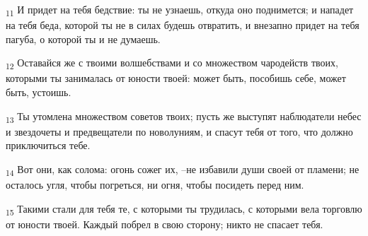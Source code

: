 \begin{tcolorbox}
\textsubscript{11} И придет на тебя бедствие: ты не узнаешь, откуда оно поднимется; и нападет на тебя беда, которой ты не в силах будешь отвратить, и внезапно придет на тебя пагуба, о которой ты и не думаешь.
\end{tcolorbox}
\begin{tcolorbox}
\textsubscript{12} Оставайся же с твоими волшебствами и со множеством чародейств твоих, которыми ты занималась от юности твоей: может быть, пособишь себе, может быть, устоишь.
\end{tcolorbox}
\begin{tcolorbox}
\textsubscript{13} Ты утомлена множеством советов твоих; пусть же выступят наблюдатели небес и звездочеты и предвещатели по новолуниям, и спасут тебя от того, что должно приключиться тебе.
\end{tcolorbox}
\begin{tcolorbox}
\textsubscript{14} Вот они, как солома: огонь сожег их, --не избавили души своей от пламени; не осталось угля, чтобы погреться, ни огня, чтобы посидеть перед ним.
\end{tcolorbox}
\begin{tcolorbox}
\textsubscript{15} Такими стали для тебя те, с которыми ты трудилась, с которыми вела торговлю от юности твоей. Каждый побрел в свою сторону; никто не спасает тебя.
\end{tcolorbox}
